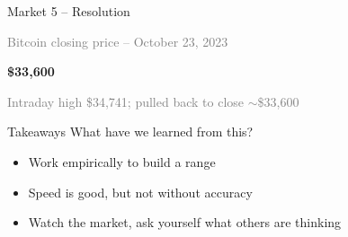 \begin{frame}{Market 5 -- Resolution}
  \begin{center}
    \vspace{0.3cm}
    \textcolor{gray}{\small Bitcoin closing price -- October 23, 2023}

    \vspace{0.5cm}
    \begin{tcolorbox}[
      enhanced, sharp corners,
      colback=sqt-themecolour!15, colframe=sqt-themecolour,
      left=20pt, right=20pt, top=12pt, bottom=12pt,
      boxrule=1.5pt,
    ]
      \centering\Huge\textbf{\$33{,}600}
    \end{tcolorbox}
    \vspace{0.3cm}
    \textcolor{gray}{\small Intraday high \$34{,}741; pulled back to close ${\sim}$\$33{,}600}
  \end{center}
\end{frame}

\begin{frame}{Takeaways}
  What have we learned from this?
  \begin{itemize}
    \item Work empirically to build a range
    \item Speed is good, but not without accuracy
    \item Watch the market, ask yourself what others are thinking
  \end{itemize}
\end{frame}
